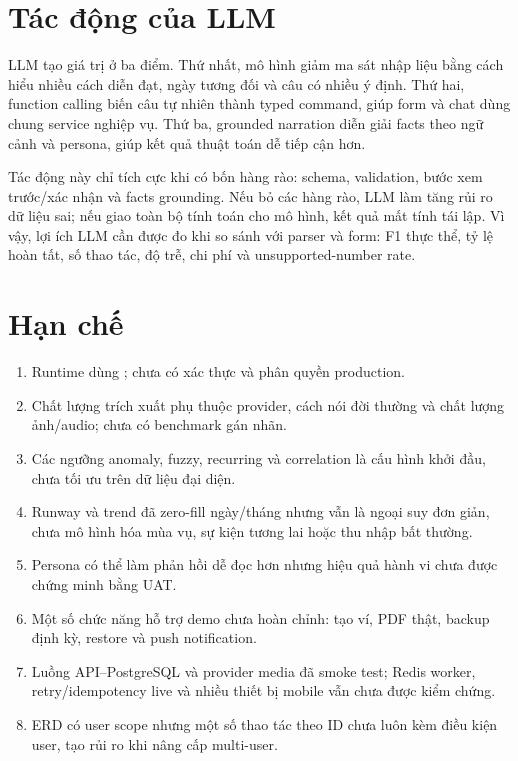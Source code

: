 \section{Tác động của LLM}

LLM tạo giá trị ở ba điểm. Thứ nhất, mô hình giảm ma sát nhập liệu bằng cách hiểu nhiều cách diễn đạt, ngày tương đối và câu có nhiều ý định. Thứ hai, function calling biến câu tự nhiên thành typed command, giúp form và chat dùng chung service nghiệp vụ. Thứ ba, grounded narration diễn giải facts theo ngữ cảnh và persona, giúp kết quả thuật toán dễ tiếp cận hơn.

Tác động này chỉ tích cực khi có bốn hàng rào: schema, validation, bước xem trước/xác nhận và facts grounding. Nếu bỏ các hàng rào, LLM làm tăng rủi ro dữ liệu sai; nếu giao toàn bộ tính toán cho mô hình, kết quả mất tính tái lập. Vì vậy, lợi ích LLM cần được đo khi so sánh với parser và form: F1 thực thể, tỷ lệ hoàn tất, số thao tác, độ trễ, chi phí và unsupported-number rate.

\section{Hạn chế}

\begin{enumerate}
  \item Runtime dùng ; chưa có xác thực và phân quyền production.
  \item Chất lượng trích xuất phụ thuộc provider, cách nói đời thường và chất lượng ảnh/audio; chưa có benchmark gán nhãn.
  \item Các ngưỡng anomaly, fuzzy, recurring và correlation là cấu hình khởi đầu, chưa tối ưu trên dữ liệu đại diện.
  \item Runway và trend đã zero-fill ngày/tháng nhưng vẫn là ngoại suy đơn giản, chưa mô hình hóa mùa vụ, sự kiện tương lai hoặc thu nhập bất thường.
  \item Persona có thể làm phản hồi dễ đọc hơn nhưng hiệu quả hành vi chưa được chứng minh bằng UAT.
  \item Một số chức năng hỗ trợ demo chưa hoàn chỉnh: tạo ví, PDF thật, backup định kỳ, restore và push notification.
  \item Luồng API--PostgreSQL và provider media đã smoke test; Redis worker, retry/idempotency live và nhiều thiết bị mobile vẫn chưa được kiểm chứng.
  \item ERD có user scope nhưng một số thao tác theo ID chưa luôn kèm điều kiện user, tạo rủi ro khi nâng cấp multi-user.
\end{enumerate}

